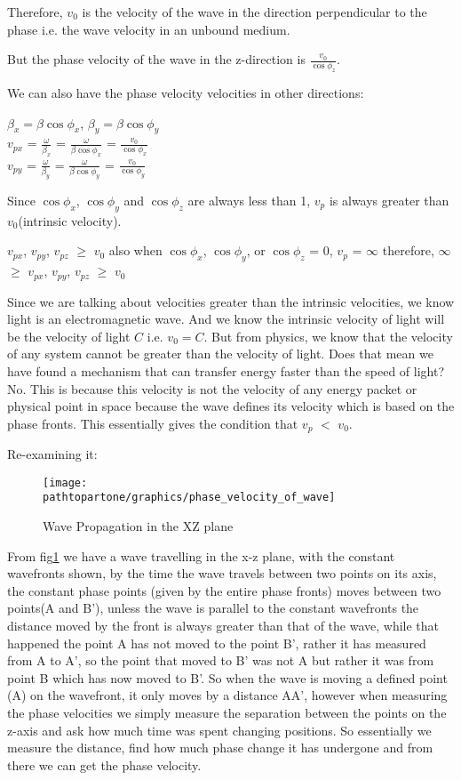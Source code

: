 Therefore, $v_0$ is the velocity of the wave in the direction perpendicular to the phase i.e. the wave velocity in an unbound medium.

But the phase velocity of the wave in the z-direction is $\frac{v_0}{\cos\phi_{z}}$.

We can also have the phase velocity velocities in other directions:
\begin{center}
$\beta_x = \beta\cos\phi_{x}$, $\beta_y = \beta\cos\phi_{y}$\\
$v_{px}$ = $\frac{\omega}{\beta_x}$ = $\frac{\omega}{\beta\cos\phi_{x}}$ = $\frac{v_0}{\cos\phi_{x}}$\\
$v_{py}$ = $\frac{\omega}{\beta_y}$ = $\frac{\omega}{\beta\cos\phi_{y}}$ = $\frac{v_0}{\cos\phi_{y}}$
\end{center}
Since $\cos\phi_{x}$, $\cos\phi_{y}$ and $\cos\phi_{z}$ are always less than 1, $v_p$ is always greater than $v_0$(intrinsic velocity).
\begin{center}
$v_{px}$, $v_{py}$, $v_{pz}$ $\geq$ $v_0$
also when $\cos\phi_{x}$, $\cos\phi_{y}$, or $\cos\phi_{z}$ = 0, $v_p$ = $\infty$
therefore, $\infty$ $\geq$ $v_{px}$, $v_{py}$, $v_{pz}$ $\geq$ $v_0$
\end{center}
Since we are talking about velocities greater than the intrinsic velocities, we know light is an electromagnetic wave. And we know the intrinsic velocity of light will be the velocity of light $C$ i.e. $v_0 = C$.
But from physics, we know that the velocity of any system cannot be greater than the velocity of light.
Does that mean we have found a mechanism that can transfer energy faster than the speed of light?
No. This is because this velocity is not the velocity of any energy packet or physical point in space because the wave defines its velocity which is based on the phase fronts. This essentially gives the condition that $v_p$ $<$ $v_0$.

Re-examining it:
\begin{figure}[h]
\centering
\texttt{[image: \\pathtopartone/graphics/phase\_velocity\_of\_wave]}
\caption{Wave Propagation in the XZ plane}
\label{fig:wave_with_constant_wave_fonts_in_xy_plane}
\end{figure}

From fig\ref{fig:wave_with_constant_wave_fonts_in_xy_plane} we have a wave travelling in the x-z plane, with the constant wavefronts shown, by the time the wave travels between two points on its axis, the constant phase points (given by the entire phase fronts) moves between two points(A and B'), unless the wave is parallel to the constant wavefronts the distance moved by the front is always greater than that of the wave, while that happened the point A has not moved to the point B', rather it has measured from A to A', so the point that moved to B' was not A but rather it was from point B which has now moved to B'. So when the wave is moving a defined point (A) on the wavefront, it only moves by a distance AA', however when measuring the phase velocities we simply measure the separation between the points on the z-axis and ask how much time was spent changing positions. So essentially we measure the distance, find how much phase change it has undergone and from there we can get the phase velocity.

